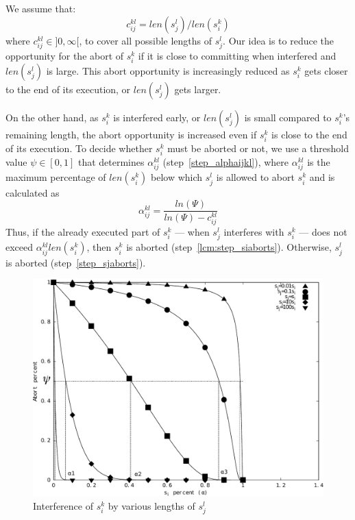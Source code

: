 We assume that:
\begin{equation}
c_{ij}^{kl}=len(s_{j}^{l})/len(s_{i}^{k})
\label{cm_eq}\end{equation}
where $c_{ij}^{kl}\in]0,\infty[$, to cover all possible lengths of $s_{j}^{l}$.
Our idea is to reduce the opportunity for the abort of $s_{i}^{k}$ if it is close to committing when interfered and $len(s_{j}^{l})$ is large. This abort opportunity is increasingly reduced as $s_{i}^{k}$ gets closer to the end of its execution, or $len(s_{j}^{l})$ gets larger. 

On the other hand, as $s_{i}^{k}$ is interfered early,
or $len(s_{j}^{l})$ is small compared to $s_{i}^{k}$'s remaining length, the abort opportunity 
is increased even if $s_i^k$ is close to the end of its execution. To decide whether $s_{i}^{k}$ must be aborted or not, we use a threshold value $\psi\in[0,1]$ that determines $\alpha_{ij}^{kl}$ (step~\ref{step_alphaijkl}), where $\alpha_{ij}^{kl}$ is the maximum percentage of $len(s_i^k)$ below which $s_j^l$ is allowed to abort $s_i^k$ and is calculated as 
%
\begin{equation}
\alpha_{ij}^{kl}=\frac{ln\left(\Psi\right)}{ln\left(\Psi\right)-c_{ij}^{kl}}
\label{eq:lcm_alpha_ij_kl}
\end{equation}
%
Thus, if the already executed part of $s_i^k$ --- when $s_j^l$ interferes with $s_i^k$ --- does not exceed $\alpha_{ij}^{kl}len(s_i^k)$, then $s_i^k$ is aborted (step~\ref{lcm:step_siaborts}). Otherwise, $s_j^l$ is aborted (step~\ref{step_sjaborts}).
%
\begin{figure}[htbp]
\centering
\includegraphics[scale=0.4]{figures/figure16}
\caption{\label{fig16}Interference of $s_{i}^{k}$ by various lengths of 
$s_{j}^{l}$}
\end{figure}

